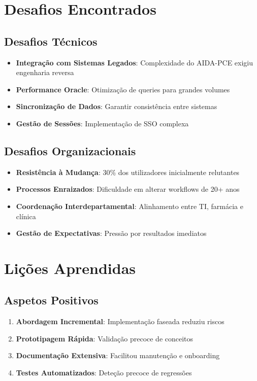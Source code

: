 \section{Desafios Encontrados}

\subsection{Desafios Técnicos}

\begin{itemize}
    \item \textbf{Integração com Sistemas Legados}: Complexidade do AIDA-PCE exigiu engenharia reversa \cite{keasberry2017}
    \item \textbf{Performance Oracle}: Otimização de queries para grandes volumes \cite{jiang2014}
    \item \textbf{Sincronização de Dados}: Garantir consistência entre sistemas
    \item \textbf{Gestão de Sessões}: Implementação de SSO complexa
\end{itemize}

\subsection{Desafios Organizacionais}

\begin{itemize}
    \item \textbf{Resistência à Mudança}: 30\% dos utilizadores inicialmente relutantes \cite{rogers2003}
    \item \textbf{Processos Enraizados}: Dificuldade em alterar workflows de 20+ anos
    \item \textbf{Coordenação Interdepartamental}: Alinhamento entre TI, farmácia e clínica
    \item \textbf{Gestão de Expectativas}: Pressão por resultados imediatos
\end{itemize}

\section{Lições Aprendidas}

\subsection{Aspetos Positivos}

\begin{enumerate}
    \item \textbf{Abordagem Incremental}: Implementação faseada reduziu riscos \cite{may2013}
    \item \textbf{Prototipagem Rápida}: Validação precoce de conceitos
    \item \textbf{Documentação Extensiva}: Facilitou manutenção e onboarding
    \item \textbf{Testes Automatizados}: Deteção precoce de regressões \cite{fowler2018}
\end{enumerate}

